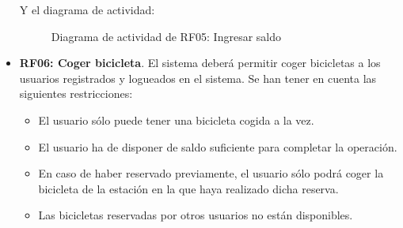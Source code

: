 \begin{itemize}
	Y el diagrama de actividad:
	
	\begin{figure}[!htb]
		\centering
		\caption{Diagrama de actividad de RF05: Ingresar saldo}
		\label{fig:diagramaActividad_RF05}
	\end{figure}
	
	\FloatBarrier
	\item \textbf{RF06: Coger bicicleta}. El sistema deberá permitir coger bicicletas a los usuarios registrados y logueados en el sistema. Se han tener en cuenta las siguientes restricciones:
	\begin{itemize}
		\item El usuario sólo puede tener una bicicleta cogida a la vez.
		\item El usuario ha de disponer de saldo suficiente para completar la operación.
		\item En caso de haber reservado previamente, el usuario sólo podrá coger la bicicleta de la estación en la que haya realizado dicha reserva.
		\item Las bicicletas reservadas por otros usuarios no están disponibles.
	\end{itemize}
	

\end{itemize}
